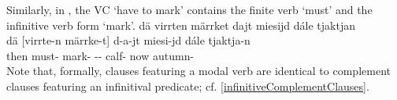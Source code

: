 Similarly, in , the VC  ‘have to mark’ contains the finite verb  ‘must’ and the infinitive verb form  ‘mark’. 
\ea\label{VCex5a}
\glll	dä virrten märrket dajt miesijd dále tjaktjan\\
	dä {[virrte-n} {märrke-t]\subVC} d-a-jt miesi-jd dále tjaktja-n\\
	then must- mark- -- calf- now autumn-\\\nopagebreak
{}	
\z
Note that, formally, clauses featuring a modal verb are identical to complement clauses featuring an infinitival predicate; cf. \SEC\ref{infinitiveComplementClauses}. 

